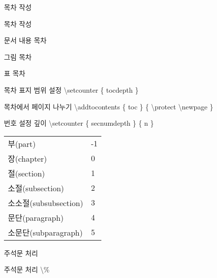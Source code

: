 \documentclass[ aspectratio=149,  14pt,blue,xcolor=pdftex,dvipsnames,table,handout,notes]{beamer}
\begin{document}
		\begin{frame}[t]{목차 작성}

			\begin{block} {목차 작성}
			\begin{description}[12345678901234567890]
			\item [\textbf{\textbackslash table of contents}] 	문서 내용 목차
			\item [\textbf{\textbackslash list of figures}]		그림 목차
			\item [\textbf{\textbackslash list of tables}] 		표 목차
			\end{description}
			\end{block}

			\begin{block} {목차 표지 범위 설정}
			\textbackslash setcounter \{ tocdepth \} 
			\end{block}

			\begin{block} {목차에서 페이지 나누기}
			\textbackslash addtocontents \{ toc \} \{ \textbackslash protect \textbackslash newpage \}
			\end{block}

			\begin{block} {번호 설정 깊이 }
			\textbackslash setcounter \{ secnumdepth \} \{ n \} 
			\end{block}

			\begin{tabular}{ l l }
				\hline
				부(part)				&-1\\
				장(chapter)			&0\\
				절(section)			&1\\
				소절(subsection)		&2\\
				소소절(subsubsection)	&3\\
				문단(paragraph)		&4\\
				소문단(subparagraph)	&5\\
				\hline
			\end{tabular}

		\end{frame}




		\begin{frame}[t]{주석문 처리}

			\begin{block} {주석문 처리}
			\textbackslash \%
			\end{block}

		\end{frame}
\end{document}
